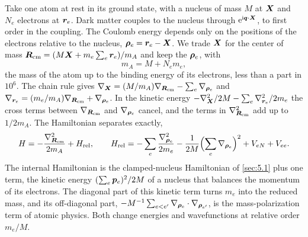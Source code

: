 Take one atom at rest in its ground state, with a nucleus of mass $M$ at $\bm{X}$ and $N_e$ electrons at $\bm{r}_e$. Dark matter couples to the nucleus through $\mathrm{e}^{\mathrm{i}\bm{q}\cdot\bm{X}}$, to first order in the coupling. The Coulomb energy depends only on the positions of the electrons relative to the nucleus, $\bm{\rho}_e = \bm{r}_e - \bm{X}$. We trade $\bm{X}$ for the center of mass $\bm{R}_{\mathrm{cm}} = (M\bm{X} + m_e\sum_e\bm{r}_e)/m_A$ and keep the $\bm{\rho}_e$, with
\begin{equation}
  m_A = M + N_em_e ,
  \label{eq:12.2-mA}
\end{equation}
the mass of the atom up to the binding energy of its electrons, less than a part in $10^{6}$. The chain rule gives $\nabla_{\bm{X}} = (M/m_A)\nabla_{\bm{R}_{\mathrm{cm}}} - \sum_e\nabla_{\bm{\rho}_e}$ and $\nabla_{\bm{r}_e} = (m_e/m_A)\nabla_{\bm{R}_{\mathrm{cm}}} + \nabla_{\bm{\rho}_e}$. In the kinetic energy $-\nabla_{\bm{X}}^2/2M - \sum_e\nabla_{\bm{r}_e}^2/2m_e$ the cross terms between $\nabla_{\bm{R}_{\mathrm{cm}}}$ and $\nabla_{\bm{\rho}_e}$ cancel, and the terms in $\nabla_{\bm{R}_{\mathrm{cm}}}^2$ add up to $1/2m_A$. The Hamiltonian separates exactly,
\begin{equation}
  H = -\frac{\nabla_{\bm{R}_{\mathrm{cm}}}^2}{2m_A} + H_{\mathrm{rel}} , \qquad
  H_{\mathrm{rel}} = -\sum_e\frac{\nabla_{\bm{\rho}_e}^2}{2m_e} - \frac{1}{2M}\Bigl(\sum_e\nabla_{\bm{\rho}_e}\Bigr)^2 + V_{eN} + V_{ee} .
  \label{eq:12.2-Hint}
\end{equation}
The internal Hamiltonian is the clamped-nucleus Hamiltonian of \cref{sec:5.1} plus one term, the kinetic energy $(\sum_e\bm{p}_e)^2/2M$ of a nucleus that balances the momentum of its electrons. The diagonal part of this kinetic term turns $m_e$ into the reduced mass, and its off-diagonal part, $-M^{-1}\sum_{e<e'}\nabla_{\bm{\rho}_e}\cdot\nabla_{\bm{\rho}_{e'}}$, is the mass-polarization term of atomic physics. Both change energies and wavefunctions at relative order $m_e/M$.

